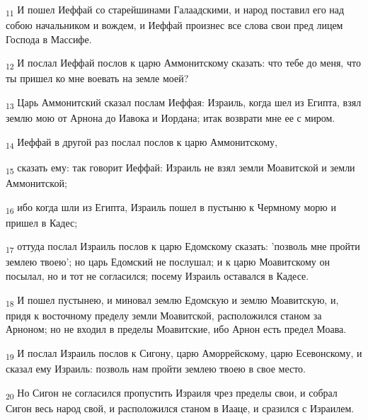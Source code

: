 \begin{tcolorbox}
\textsubscript{11} И пошел Иеффай со старейшинами Галаадскими, и народ поставил его над собою начальником и вождем, и Иеффай произнес все слова свои пред лицем Господа в Массифе.
\end{tcolorbox}
\begin{tcolorbox}
\textsubscript{12} И послал Иеффай послов к царю Аммонитскому сказать: что тебе до меня, что ты пришел ко мне воевать на земле моей?
\end{tcolorbox}
\begin{tcolorbox}
\textsubscript{13} Царь Аммонитский сказал послам Иеффая: Израиль, когда шел из Египта, взял землю мою от Арнона до Иавока и Иордана; итак возврати мне ее с миром.
\end{tcolorbox}
\begin{tcolorbox}
\textsubscript{14} Иеффай в другой раз послал послов к царю Аммонитскому,
\end{tcolorbox}
\begin{tcolorbox}
\textsubscript{15} сказать ему: так говорит Иеффай: Израиль не взял земли Моавитской и земли Аммонитской;
\end{tcolorbox}
\begin{tcolorbox}
\textsubscript{16} ибо когда шли из Египта, Израиль пошел в пустыню к Чермному морю и пришел в Кадес;
\end{tcolorbox}
\begin{tcolorbox}
\textsubscript{17} оттуда послал Израиль послов к царю Едомскому сказать: 'позволь мне пройти землею твоею'; но царь Едомский не послушал; и к царю Моавитскому он посылал, но и тот не согласился; посему Израиль оставался в Кадесе.
\end{tcolorbox}
\begin{tcolorbox}
\textsubscript{18} И пошел пустынею, и миновал землю Едомскую и землю Моавитскую, и, придя к восточному пределу земли Моавитской, расположился станом за Арноном; но не входил в пределы Моавитские, ибо Арнон есть предел Моава.
\end{tcolorbox}
\begin{tcolorbox}
\textsubscript{19} И послал Израиль послов к Сигону, царю Аморрейскому, царю Есевонскому, и сказал ему Израиль: позволь нам пройти землею твоею в свое место.
\end{tcolorbox}
\begin{tcolorbox}
\textsubscript{20} Но Сигон не согласился пропустить Израиля чрез пределы свои, и собрал Сигон весь народ свой, и расположился станом в Иааце, и сразился с Израилем.
\end{tcolorbox}
